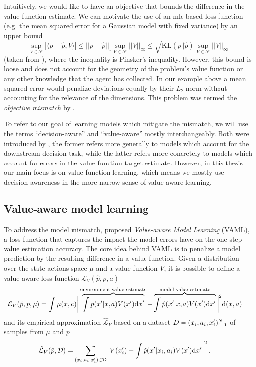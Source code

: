 Intuitively, we would like to have an objective that bounds the difference in the value function estimate.
We can motivate the use of an \ac{mle}-based loss function (e.g. the mean squared error for a Gaussian model with fixed variance) {by an upper bound}
$$\sup_{V \in \mathcal{F}}|\langle p - \hat{p}, V\rangle|\leq ||p - \hat{p}||_1 \sup_{V \in \mathcal{F}}||V||_\infty \leq \sqrt{\text{KL}(p||\hat{p})}\sup_{V \in \mathcal{F}}||V||_\infty$$ 
(taken from
\textcite{vaml}), where the inequality is Pinsker's inequality.
However, this bound is loose and does not account for the geometry of the problem's value function or any other knowledge that the agent has collected. 
In our example above a mean squared error would penalize deviations equally by their $L_2$ norm without accounting for the relevance of the dimensions.
This problem was termed the \emph{objective mismatch} by \textcite{lambert202objective}.

To refer to our goal of learning models which mitigate the mismatch, we will use the terms ``decision-aware'' and ``value-aware'' mostly interchangeably.
Both were introduced by \textcite{vaml}, the former refers more generally to models which account for the downstream decision task, while the latter refers more concretely to models which account for errors in the value function target estimate.
However, in this thesis our main focus is on value function learning, which means we mostly use decision-awareness in the more narrow sense of value-aware learning.

\subsection{Value-aware model learning}

To address the model mismatch, \textcite{vaml} proposed \emph{Value-aware Model Learning} (VAML), a loss function that captures the impact the model errors have on the one-step value estimation accuracy.
The core idea behind VAML is to penalize a model prediction by the resulting difference in a value function. Given a distribution over the state-actions space $\mu$ and a value function $V$, it is possible to define a value-aware loss function $\mathcal{L}_V(\hat{p}, p, \mu)$
\begin{align}
    &\mathcal{L}_V(\hat{p}, p, \mu) = \int \mu(x,a) \bigg|\overbrace{\int p(x'|x,a)V(x')\mathrm{d}x'}^{\text{environment value estimate}}  - \overbrace{\int \hat{p}(x'|x,a) V(x') \mathrm{d}x'}^{\text{model value estimate}}\bigg|^2 \mathrm{d} (x,a)
\end{align}
and its empirical approximation $\hat{\mathcal{L}}_V$ based on a dataset $D = (x_i,a_i,x'_i)_{i=1}^N$ of samples from $\mu$ and $p$
\begin{align}
    &\hat{\mathcal{L}}_V(\hat{p}, \mathcal{D}) = \sum_{(x_i,a_i,x'_i)\in\mathcal{D}} \left|V(x'_i) - \int \hat{p}(x'|x_i,a_i) V(x') \mathrm{d} x'\right|^2\label{eq:background:IterVAMLloss}.
\end{align}

